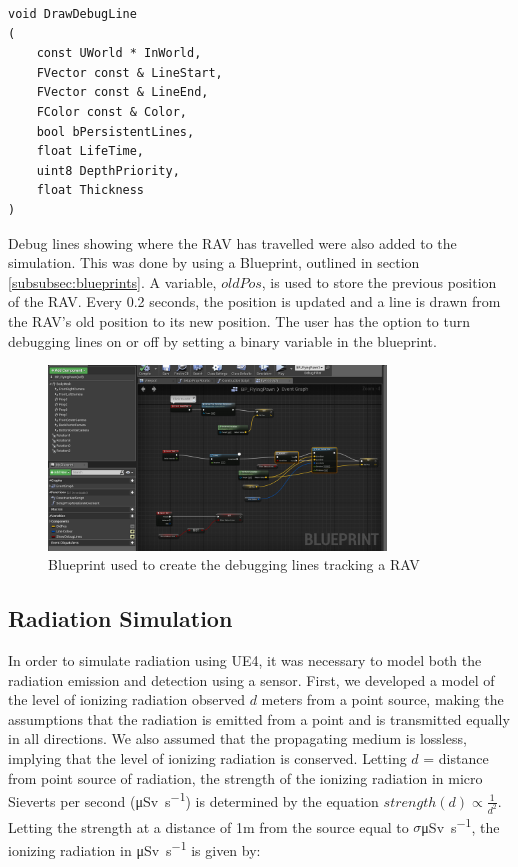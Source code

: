 \begin{verbatim}
void DrawDebugLine
(
    const UWorld * InWorld,
    FVector const & LineStart,
    FVector const & LineEnd,
    FColor const & Color,
    bool bPersistentLines,
    float LifeTime,
    uint8 DepthPriority,
    float Thickness
)
\end{verbatim}
\par


Debug lines showing where the RAV has travelled were also added to the simulation. This was done by using a Blueprint, outlined in section \ref{subsubsec:blueprints}. A variable, $oldPos$, is used to store the previous position of the RAV. Every 0.2 seconds, the position is updated and a line is drawn from the RAV's old position to its new position. The user has the option to turn debugging lines on or off by setting a binary variable in the blueprint.

\begin{figure}
    \centering
    \includegraphics[width=0.8\textwidth]{Chapters/SimulationEnv/Figs/DebuggingLines/PathTracingDebugLines.png}
    \caption{Blueprint used to create the debugging lines tracking a RAV}
    \label{fig:TracingDebuggingLines}
\end{figure}

\subsection{Radiation Simulation}
In order to simulate radiation using UE4, it was necessary to model both the radiation emission and detection using a sensor. First, we developed a model of the level of ionizing radiation observed $d$ meters from a point source, making the assumptions that the radiation is emitted from a point and is transmitted equally in all directions. We also assumed that the propagating medium is lossless, implying that the level of ionizing radiation is conserved. Letting $d$ = distance from point source of radiation, the strength of the ionizing radiation in micro Sieverts per second (\si{\micro\sievert\per\second}) is determined by the equation  $strength(d) \propto \frac{1}{d^2}$. Letting the strength at a distance of 1m from the source equal to
$\sigma$\si{\micro\sievert\per\second}, the ionizing radiation in \si{\micro\sievert\per\second} is given by:

